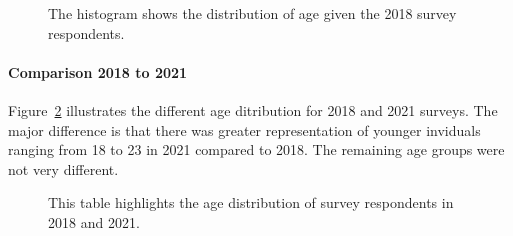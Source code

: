 \documentclass[
  letterpaper,
  DIV=11,
  numbers=noendperiod]{scrartcl}
\let\oldparagraph\paragraph
\renewcommand{\paragraph}[1]{\oldparagraph{#1}\mbox{}}
\begin{document}
\begin{figure}


\caption{\label{fig-one}The histogram shows the distribution of age
given the 2018 survey respondents.}

\end{figure}%

\newpage

\paragraph{Comparison 2018 to 2021}\label{comparison-2018-to-2021}

Figure~\ref{fig-two} illustrates the different age ditribution for 2018
and 2021 surveys. The major difference is that there was greater
representation of younger inviduals ranging from 18 to 23 in 2021
compared to 2018. The remaining age groups were not very different.

\begin{figure}


\caption{\label{fig-two}This table highlights the age distribution of
survey respondents in 2018 and 2021.}

\end{figure}%
\end{document}
